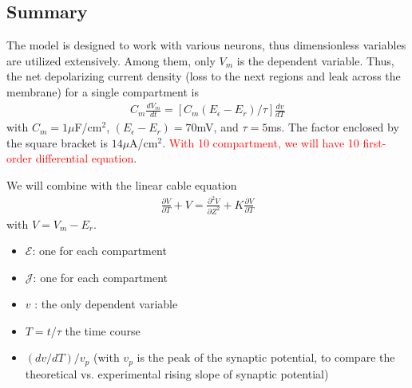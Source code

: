 
\subsection{Summary}
\label{sec:summary-2}

The model is designed to work with various neurons, thus dimensionless
variables are utilized extensively. Among them, only $V_m$ is the
dependent variable. Thus, the net depolarizing current density (loss
to the next regions and leak across the membrane) for a single
compartment is
\begin{eqnarray}
  \label{eq:549}
  C_m\frac{dV_m}{dt} = \left[C_m(E_\epsilon-E_r)/\tau\right] \frac{dv}{dT}
\end{eqnarray}
with $C_m=1\mu$F/cm$^2$, $(E_\epsilon-E_r)=70$mV, and $\tau=5$ms. The
factor enclosed by the square bracket is $14\mu$A/cm$^2$.
\textcolor{red}{With 10 compartment, we will have 10 first-order
  differential equation}.

We will combine with the linear cable equation
\begin{eqnarray}
  \label{eq:552}
  \frac{\partial V}{\partial T} + V  = \frac{\partial^2V}{\partial Z^2} + K\frac{\partial V}{\partial T}
\end{eqnarray}
with $V=V_m-E_r$.

\begin{itemize}
\item $\mathcal{E}$: one for each compartment
\item $\mathcal{J}$: one for each compartment
\item $v$ : the only dependent variable
\item $T=t/\tau$ the time course
\item $(dv/dT)/v_p$ (with $v_p$ is the peak of the synaptic potential,
  to compare the theoretical vs. experimental rising slope of synaptic
  potential)
\end{itemize}

